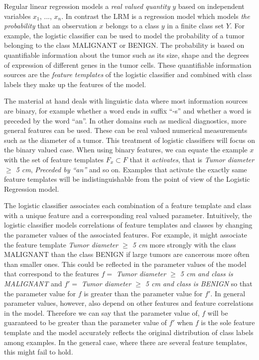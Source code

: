 Regular linear regression models a {\it real valued quantity} $y$
based on independent variables $x_1$, ..., $x_n$. In contrast the LRM
is a regression model which models {\it the probability} that an
observation $x$ belongs to a class $y$ in a finite class set $Y$. For
example, the logistic classifier can be used to model the probability
of a tumor belonging to the class {\sc MALIGNANT} or BENIGN. The
probability is based on quantifiable information about the tumor such
as its size, shape and the degrees of expression of different genes in
the tumor cells. These quantifiable information sources are the {\it
  feature templates} of the logistic classifier and combined with
class labels they make up the features of the
model. %

The material at hand deals with linguistic data where most information
sources are binary, for example whether a word ends in suffix ``-s''
and whether a word is preceded by the word ``an''. In other domains
such as medical diagnostics, more general features can be used. These
can be real valued numerical measurements such as the diameter of a
tumor. This treatment of logistic classifiers will focus on the binary
valued case. When using binary features, we can equate the example $x$
with the set of feature templates $F_x \subset F$ that it {\it
  activates}, that is {\it Tumor diameter $\geq$ 5 cm}, {\it Preceded
  by ``an''} and so on. Examples that activate the exactly same
feature templates will be indistinguishable from the point of view of the
Logistic Regression model.

The logistic classifier associates each combination of a feature
template and class with a unique feature and a corresponding real
valued parameter. Intuitively, the logistic classifier models
correlations of feature templates and classes by changing the
parameter values of the associated features. For example, it might
associate the feature template {\it Tumor diameter $\geq$ 5 cm} more
strongly with the class MALIGNANT than the class BENIGN if large
tumors are cancerous more often than smaller ones. This could be
reflected in the parameter values of the model that correspond to the
features $f =$ {\it Tumor diameter $\geq$ 5 cm and class is MALIGNANT}
and $f' =$ {\it Tumor diameter $\geq$ 5 cm and class is BENIGN} so
that the parameter value for $f$ is greater than the parameter value
for $f'$. In general parameter values, however, also depend on other
features and feature correlations in the model. Therefore we can say
that the parameter value of, $f$ will be guaranteed to be greater than
the parameter value of $f'$ when $f$ is the sole feature template and
the model accurately reflects the original distribution of class
labels among examples. In the general case, where there are several
feature templates, this might fail to hold.

